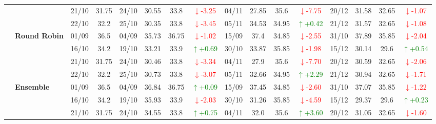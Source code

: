 {\begin{longtable}{llcc|cccc|cccc|cccc}
&
& 21/10 & 31.75 & 24/10 & 30.55 & 33.8 & \textcolor{red}{\(\downarrow\)-3.25} & 04/11 & 27.85 & 35.6 & \textcolor{red}{\(\downarrow\)-7.75} & 20/12 & 31.58 & 32.65 & \textcolor{red}{\(\downarrow\)-1.07} \\

&
& 22/10 & 32.2 & 25/10 & 30.35 & 33.8 & \textcolor{red}{\(\downarrow\)-3.45} & 05/11 & 34.53 & 34.95 & \textcolor{green}{\(\uparrow\)+0.42} & 21/12 & 31.57 & 32.65 & \textcolor{red}{\(\downarrow\)-1.08} \\
\cmidrule(lr){2-16}


& \textbf{Round Robin}
& 01/09 & 36.5 & 04/09 & 35.73 & 36.75 & \textcolor{red}{\(\downarrow\)-1.02} & 15/09 & 37.4 & 34.85 & \textcolor{red}{\(\downarrow\)-2.55} & 31/10 & 37.89 & 35.85 & \textcolor{red}{\(\downarrow\)-2.04} \\

&
& 16/10 & 34.2 & 19/10 & 33.21 & 33.9 & \textcolor{green}{\(\uparrow\)+0.69} & 30/10 & 33.87 & 35.85 & \textcolor{red}{\(\downarrow\)-1.98} & 15/12 & 30.14 & 29.6 & \textcolor{green}{\(\uparrow\)+0.54} \\

&
& 21/10 & 31.75 & 24/10 & 30.46 & 33.8 & \textcolor{red}{\(\downarrow\)-3.34} & 04/11 & 27.9 & 35.6 & \textcolor{red}{\(\downarrow\)-7.70} & 20/12 & 30.59 & 32.65 & \textcolor{red}{\(\downarrow\)-2.06} \\

&
& 22/10 & 32.2 & 25/10 & 30.73 & 33.8 & \textcolor{red}{\(\downarrow\)-3.07} & 05/11 & 32.66 & 34.95 & \textcolor{green}{\(\uparrow\)+2.29} & 21/12 & 30.94 & 32.65 & \textcolor{red}{\(\downarrow\)-1.71} \\
\cmidrule(lr){2-16}



& \textbf{Ensemble}
& 01/09 & 36.5 & 04/09 & 36.84 & 36.75 & \textcolor{green}{\(\uparrow\)+0.09} & 15/09 & 37.45 & 34.85 & \textcolor{red}{\(\downarrow\)-2.60} & 31/10 & 37.07 & 35.85 & \textcolor{red}{\(\downarrow\)-1.22} \\

&
& 16/10 & 34.2 & 19/10 & 35.93 & 33.9 & \textcolor{red}{\(\downarrow\)-2.03} & 30/10 & 31.26 & 35.85 & \textcolor{red}{\(\downarrow\)-4.59} & 15/12 & 29.37 & 29.6 & \textcolor{green}{\(\uparrow\)+0.23} \\

&
& 21/10 & 31.75 & 24/10 & 34.55 & 33.8 & \textcolor{green}{\(\uparrow\)+0.75} & 04/11 & 32.0 & 35.6 & \textcolor{green}{\(\uparrow\)+3.60} & 20/12 & 31.05 & 32.65 & \textcolor{red}{\(\downarrow\)-1.60} \\


\end{longtable}}

